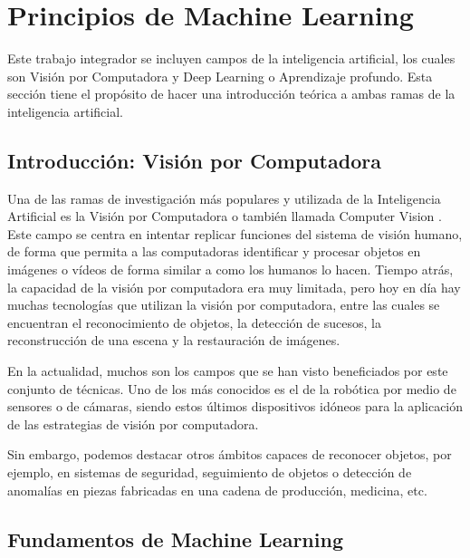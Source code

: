 \label{Principios de Machine Learning}
\section{Principios de Machine Learning}

Este trabajo integrador se incluyen campos de la inteligencia artificial, los cuales son Visión por Computadora y Deep Learning o Aprendizaje profundo. 
Esta sección tiene el propósito de hacer una introducción teórica a ambas ramas de la inteligencia artificial.

\subsection{Introducción: Visión por Computadora}
Una de las ramas de investigación más populares y utilizada de la Inteligencia Artificial es la Visión por Computadora o también llamada Computer Vision \cite{computervision1} \cite{computervision2} \cite{computervision3}.
Este campo se centra en intentar replicar funciones del sistema de visión humano, de forma que permita a las computadoras identificar y procesar objetos en imágenes o vídeos de forma similar a como los humanos lo hacen. Tiempo atrás, la capacidad de la visión por computadora era muy limitada, pero hoy en día hay muchas tecnologías que utilizan la visión por computadora, entre las cuales se encuentran el reconocimiento de objetos, la detección de sucesos, la reconstrucción de una escena y la restauración de imágenes.

En la actualidad, muchos son los campos que se han visto beneficiados por este conjunto de técnicas. Uno de los más conocidos es el de la robótica por medio de sensores o de cámaras, siendo estos últimos dispositivos idóneos para la aplicación de las estrategias de visión por computadora.

Sin embargo, podemos destacar otros ámbitos capaces de reconocer objetos, por ejemplo, en sistemas de seguridad, seguimiento de objetos o detección de anomalías en piezas fabricadas en una cadena de producción, medicina, etc.

\subsection{Fundamentos de Machine Learning}

